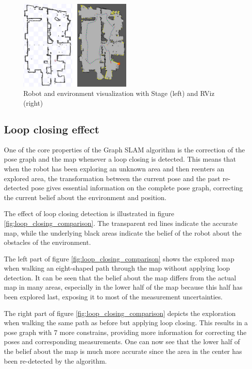 \documentclass{ba-kecs}
\begin{document}
\begin{figure}[htbp]
	\centering
		\includegraphics[width=0.50\textwidth]{figures/Stage_and_rviz.jpg}
	\caption{Robot and environment visualization with Stage (left) and RViz (right)}
	\label{fig:stage_and_rviz}
\end{figure}

\subsection{Loop closing effect}
One of the core properties of the Graph SLAM algorithm is the correction of the pose graph and the map whenever a loop closing is detected. This means that when the robot has been exploring an unknown area and then reenters an explored area, the transformation between the current pose and the past re-detected pose gives essential information on the complete pose graph, correcting the current belief about the environment and position.

The effect of loop closing detection is illustrated in figure \ref{fig:loop_closing_comparison}. The transparent red lines indicate the accurate map, while the underlying black areas indicate the belief of the robot about the obstacles of the environment.

The left part of figure \ref{fig:loop_closing_comparison} shows the explored map when walking an eight-shaped path through the map without applying loop detection. It can be seen that the belief about the map differs from the actual map in many areas, especially in the lower half of the map because this half has been explored last, exposing it to most of the measurement uncertainties.

The right part of figure \ref{fig:loop_closing_comparison} depicts the exploration when walking the same path as before but applying loop closing. This results in a pose graph with 7 more constrains, providing more information for correcting the poses and corresponding measurements. One can now see that the lower half of the belief about the map is much more accurate since the area in the center has been re-detected by the algorithm.
\end{document}
